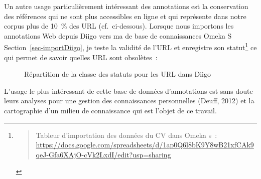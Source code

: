 \documentclass[
  a4paper,
  DIV=11,
  numbers=noendperiod]{scrreprt}
\begin{document}
Un autre usage particulièrement intéressant des annotations est la
conservation des références qui ne sont plus accessibles en ligne et qui
représente dans notre corpus plus de 10~\% des URL (cf.~ci-dessous).
Lorsque nous importons les annotations Web depuis Diigo vers ma de base
de connaissances Omeka S Section~\ref{sec-importDiigo}, je teste la
validité de l'URL et enregistre son statut\footnote{\begin{quote}
  Tableur d'importation des données du CV dans Omeka s~:
  \url{https://docs.google.com/spreadsheets/d/1ap0Q6l8bK9Y8wB21xfCAk9qeJ-Gfa6XAjO-cVk2LxdI/edit?usp=sharing}
  \end{quote}} ce qui permet de savoir quelles URL sont obsolètes~:

\begin{figure}


\caption{\label{fig-statutUrlDiigo}Répartition de la classe des statuts
pour les URL dans Diigo}

\end{figure}%

L'usage le plus intéressant de cette base de données d'annotations est
sans doute leurs analyses pour une gestion des connaissances
personnelles (Deuff, 2012) et la cartographie d'un milieu de
connaissance qui est l'objet de ce travail.
\end{document}
